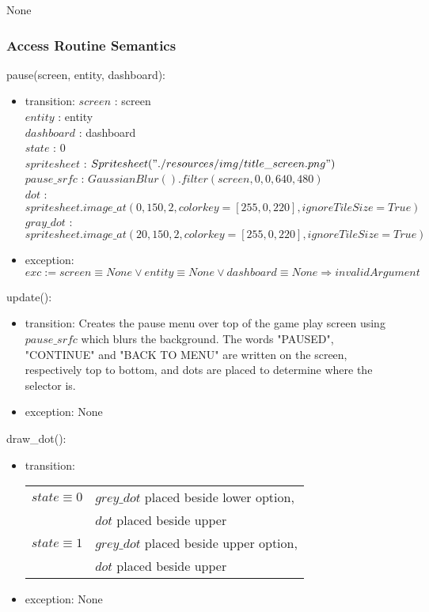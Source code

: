 \documentclass[12pt]{article}
\begin{document}
None

\subsubsection {Access Routine Semantics}

\noindent pause(screen, entity, dashboard):
\begin{itemize}
    \item transition: 
    $screen$ : screen \\
    $entity$ : entity \\
    $dashboard$ : dashboard\\
    $state$ : 0 \\
    $spritesheet$ : $Spritesheet("./resources/img/title\_screen.png")$ \\
    $pause\_srfc$ : $GaussianBlur().filter(screen, 0, 0, 640, 480)$ \\
    $dot$ : $spritesheet.image\_at(0, 150, 2, colorkey=[255, 0, 220], ignoreTileSize=True)$ \\
    $gray\_dot$ : $spritesheet.image\_at(20, 150, 2, colorkey=[255, 0, 220], ignoreTileSize=True)$ \\
    
    \item exception: $exc := screen \equiv None \lor entity \equiv None \lor dashboard \equiv None \Rightarrow invalidArgument$
\end{itemize}

\noindent update():
\begin{itemize}
    \item transition: Creates the pause menu over top of the game play screen using $pause\_srfc$ which blurs the background. The words "PAUSED", "CONTINUE" and "BACK TO MENU" are written on the screen, respectively top to bottom, and dots are placed to determine where the selector is. 
    
    \item exception: None
\end{itemize}

\noindent draw\_dot():
\begin{itemize}
    \item transition:
    
    \begin{tabular}{|l|l|}
    \hline
    $state \equiv 0$ & $grey\_dot$ placed beside lower option, \\
     & $dot$ placed beside upper \\
    \hline
    $state \equiv 1$ \equiv 60 & $grey\_dot$ placed beside upper option, \\
     & $dot$ placed beside upper \\
    \hline
    \end{tabular}
    
    \item exception: None
\end{itemize}
\end{document}
